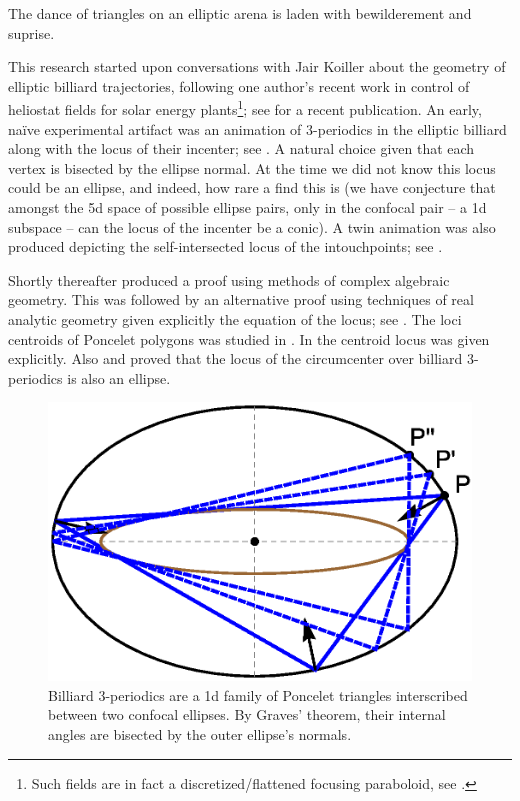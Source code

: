 The dance of triangles on an elliptic arena is laden with bewilderement and suprise. 

This research started upon conversations with Jair Koiller about the geometry of elliptic billiard trajectories, following one author's recent work in control of heliostat fields for solar energy plants\footnote{Such fields are in fact a discretized/flattened focusing paraboloid, see \cite{sundrop2016,esolar2017}.}; see \cite{gross2020-solar} for a recent publication. An early, naïve experimental artifact was an animation of 3-periodics in the elliptic billiard along with the locus of their incenter; see  \cite{dsr_vid11incenter}. A natural choice given that each vertex is bisected by the ellipse normal. At the time we did not know this locus could be an ellipse, and indeed, how rare a find this is (we have conjecture that amongst the 5d space of possible ellipse pairs, only in the confocal pair -- a 1d subspace -- can the locus of the incenter be a conic). A twin animation was also produced depicting the self-intersected locus of the intouchpoints; see \cite{dsr_vid11e}.

Shortly thereafter \cite{olga14} produced a proof using methods of complex algebraic geometry.
This was followed by an alternative    proof using techniques of real analytic   geometry given explicitly the equation of the locus; see \cite{garcia2019-incenter}. The loci centroids of Poncelet polygons was studied in \cite{schwartz2016-com}. In  \cite{garcia2019-incenter} the centroid locus was given explicitly.  Also \cite{corentin2021-circum} and \cite{garcia2018} proved that the locus of the circumcenter over billiard 3-periodics is also an ellipse.

\begin{figure}[H]
    \centering
    \includegraphics[width=.7\textwidth]{chap_01/pics/pics_01_030_three_orbits.eps}
    \caption{Billiard 3-periodics are a 1d family of Poncelet triangles interscribed between two confocal ellipses. By Graves' theorem, their internal angles are bisected by the outer ellipse's normals.}
    \label{fig:01-three-orbits-proof}
\end{figure}

